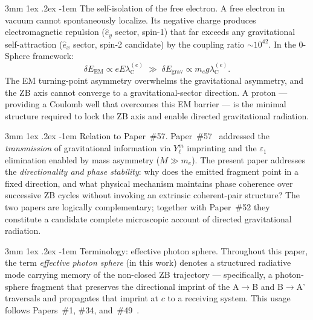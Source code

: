 \documentclass[%
 reprint, amsmath,amssymb, aps, prd, ]{revtex4-2}
\makeatletter
\numberwithin{equation}{section}
\renewcommand\paragraph{%
  \@startsection{paragraph}{4}{\z@}%
    {3mm \@plus 1ex \@minus .2ex}%
    {-1em}%
    {\normalfont\normalsize\itshape}}
\newcommand{\lambdaCe}{\lambda_{\mathrm{C}}^{(e)}}
\makeatother
\begin{document}
\paragraph{The self-isolation of the free electron.}
A free electron in vacuum cannot spontaneously localize.
Its negative charge produces electromagnetic repulsion ($\hat{e}_y$ sector, spin-1) that far exceeds any gravitational self-attraction ($\hat{e}_x$ sector, spin-2 candidate) by the coupling ratio $\sim 10^{42}$.
In the 0-Sphere framework:
\begin{equation}
\delta E_\mathrm{EM} \propto e E \lambdaCe \;\gg\; \delta E_\mathrm{grav} \propto m_e g \lambdaCe.
\end{equation}
The EM turning-point asymmetry overwhelms the gravitational asymmetry, and the ZB axis cannot converge to a gravitational-sector direction.
A proton --- providing a Coulomb well that overcomes this EM barrier --- is the minimal structure required to lock the ZB axis and enable directed gravitational radiation.

\paragraph{Relation to Paper~\#57.}
Paper~\#57~\cite{hanamura57} addressed the \emph{transmission} of gravitational information via $Y_\ell^m$ imprinting and the $\varepsilon_1$ elimination enabled by mass asymmetry ($M \gg m_e$).
The present paper addresses the \emph{directionality and phase stability}: why does the emitted fragment point in a fixed direction, and what physical mechanism maintains phase coherence over successive ZB cycles without invoking an extrinsic coherent-pair structure?
The two papers are logically complementary; together with Paper~\#52 they constitute a candidate complete microscopic account of directed gravitational radiation.

\paragraph{Terminology: effective photon sphere.}
Throughout this paper, the term \emph{effective photon sphere} (in this work) denotes a structured radiative mode carrying memory of the non-closed ZB trajectory --- specifically, a photon-sphere fragment that preserves the directional imprint of the A$\to$B and B$\to$A' traversals and propagates that imprint at $c$ to a receiving system.
This usage follows Papers~\#1, \#34, and~\#49~\cite{hanamura01,hanamura34,hanamura49}.
\end{document}
